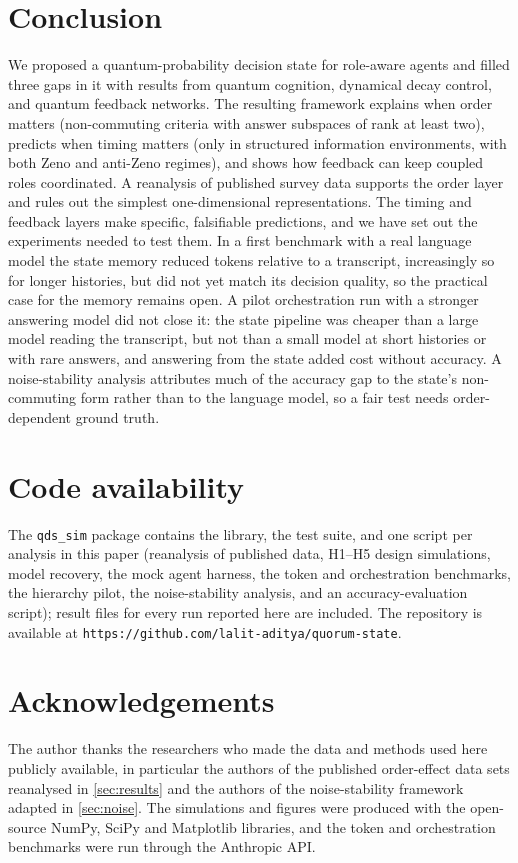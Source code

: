 \documentclass[11pt]{article}
\theoremstyle{definition}
\theoremstyle{remark}
\begin{document}
\section{Conclusion}
We proposed a quantum-probability decision state for role-aware agents and filled three gaps in it with results from quantum cognition, dynamical decay control, and quantum feedback networks. The resulting framework explains when order matters (non-commuting criteria with answer subspaces of rank at least two), predicts when timing matters (only in structured information environments, with both Zeno and anti-Zeno regimes), and shows how feedback can keep coupled roles coordinated. A reanalysis of published survey data supports the order layer and rules out the simplest one-dimensional representations. The timing and feedback layers make specific, falsifiable predictions, and we have set out the experiments needed to test them. In a first benchmark with a real language model the state memory reduced tokens relative to a transcript, increasingly so for longer histories, but did not yet match its decision quality, so the practical case for the memory remains open. A pilot orchestration run with a stronger answering model did not close it: the state pipeline was cheaper than a large model reading the transcript, but not than a small model at short histories or with rare answers, and answering from the state added cost without accuracy. A noise-stability analysis attributes much of the accuracy gap to the state's non-commuting form rather than to the language model, so a fair test needs order-dependent ground truth.

\section*{Code availability}
The \texttt{qds\_sim} package contains the library, the test suite, and one script per analysis in this paper (reanalysis of published data, H1--H5 design simulations, model recovery, the mock agent harness, the token and orchestration benchmarks, the hierarchy pilot, the noise-stability analysis, and an accuracy-evaluation script); result files for every run reported here are included. The repository is available at \texttt{https://github.com/lalit-aditya/quorum-state}.

\section*{Acknowledgements}
The author thanks the researchers who made the data and methods used here publicly available, in particular the authors of the published order-effect data sets reanalysed in \cref{sec:results} and the authors of the noise-stability framework adapted in \cref{sec:noise}. The simulations and figures were produced with the open-source NumPy, SciPy and Matplotlib libraries, and the token and orchestration benchmarks were run through the Anthropic API.



\end{document}
